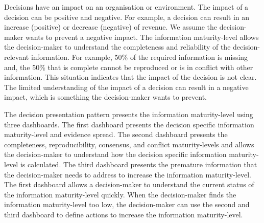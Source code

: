 \begin{center}
\large\color{document}{\rqvistwo} 
\end{center}
Decisions have an impact on an organisation or environment. The impact of a decision can be positive and negative. For example, a decision can result in an increase (positive) or decrease (negative) of revenue. We assume the decision-maker wants to prevent a negative impact. The information maturity-level allows the decision-maker to understand the completeness and reliability of the decision-relevant information. For example, 50\% of the required information is missing and, the 50\% that is complete cannot be reproduced or is in conflict with other information. This situation indicates that the impact of the decision is not clear. The limited understanding of the impact of a decision can result in a negative impact, which is something the decision-maker wants to prevent.

\begin{center}
\large\color{document}{\rqvisthree} 
\end{center}
The decision presentation pattern presents the information maturity-level using three dashboards. The first dashboard presents the decision specific information maturity-level and evidence spread. The second dashboard presents the completeness, reproducibility, consensus, and conflict maturity-levels and allows the decision-maker to understand how the decision specific information maturity-level is calculated. The third dashboard presents the premature information that the decision-maker needs to address to increase the information maturity-level. The first dashboard allows a decision-maker to understand the current status of the information maturity-level quickly. When the decision-maker finds the information maturity-level too low, the decision-maker can use the second and third dashboard to define actions to increase the information maturity-level.

